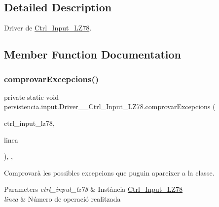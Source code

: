 \subsection{Detailed Description}
Driver de \hyperlink{classpersistencia_1_1input_1_1Ctrl__Input__LZ78}{Ctrl\+\_\+\+Input\+\_\+\+L\+Z78}. 

\subsection{Member Function Documentation}
\mbox{\label{classpersistencia_1_1input_1_1Driver____Ctrl__Input__LZ78_a285493e74dff1f6b2520f010f75b850c}} 
\subsubsection{\texorpdfstring{comprovar\+Excepcions()}{comprovarExcepcions()}}
{\footnotesize\ttfamily private static void persistencia.\+input.\+Driver\+\_\+\+\_\+\+Ctrl\+\_\+\+Input\+\_\+\+L\+Z78.\+comprovar\+Excepcions (\begin{DoxyParamCaption}\item[{\hyperlink{classpersistencia_1_1input_1_1Ctrl__Input__LZ78}{Ctrl\+\_\+\+Input\+\_\+\+L\+Z78}}]{ctrl\+\_\+input\+\_\+lz78,  }\item[{String}]{linea }\end{DoxyParamCaption})\hspace{0.3cm}{\ttfamily [inline]}, {\ttfamily [static]}, {\ttfamily [private]}}



Comprovarà les possibles excepcions que puguin apareixer a la classe. 


\begin{DoxyParams}{Parameters}
{\em ctrl\+\_\+input\+\_\+lz78} & Instància \hyperlink{classpersistencia_1_1input_1_1Ctrl__Input__LZ78}{Ctrl\+\_\+\+Input\+\_\+\+L\+Z78} \\
\hline
{\em linea} & Número de operació realitzada \\
\hline
\end{DoxyParams}

